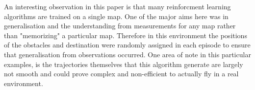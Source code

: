An interesting observation in this paper is that many reinforcment learning algorithms are trained on a single map.
One of the major aims here was in generalisation and the understanding from measurements for any map rather than "memorizing" a particular map.
Therefore in this environment the positions of the obstacles and destination were randomly assigned in each episode to ensure that generalisation from observations occurred.
One area of note in this particular examples, is the trajectories themselves that this algorithm generate are largely not smooth and could prove complex and non-efficient to actually fly in a real environment.


